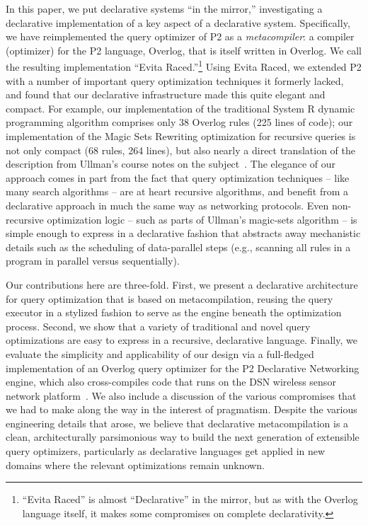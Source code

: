 \documentclass{sigmod08}
\begin{document}
In this paper, we put declarative systems ``in the mirror,''
investigating a declarative implementation of a key aspect of a
declarative system.  Specifically, we have reimplemented the query
optimizer of P2 as a {\em metacompiler}: a compiler (optimizer) for the
P2 language, Overlog, that is itself written in Overlog.  We call the
resulting implementation ``Evita Raced.''\footnote{``Evita Raced'' is
almost ``Declarative'' in the mirror, but as with the Overlog language
itself, it makes some compromises on complete declarativity.}  Using
Evita Raced, we extended P2 with a number of important query
optimization techniques it formerly lacked, and found that our
declarative infrastructure made this quite elegant and compact. For
example, our implementation of the traditional System R dynamic
programming algorithm comprises only 38 Overlog rules (225 lines of
code); our implementation of the Magic Sets Rewriting optimization for
recursive queries is not only compact (68 rules, 264 lines), but also
nearly a direct translation of the description from Ullman's course
notes on the subject~\cite{ullmanNotes}.   The elegance of our
approach comes in part from the fact that query optimization techniques
-- like many search algorithms -- are at heart recursive algorithms, and
benefit from a declarative approach in much the same way as networking
protocols.  Even non-recursive optimization logic -- such as parts of
Ullman's magic-sets algorithm -- is simple enough to express in a
declarative fashion that abstracts away mechanistic details such as the
scheduling of data-parallel steps (e.g., scanning all rules in a program
in parallel versus sequentially).

Our contributions here are three-fold.  First, we present a declarative
architecture for query optimization that is based on metacompilation,
reusing the query executor in a stylized fashion to serve as the engine beneath the optimization process.  Second, we show that a variety of traditional and novel query optimizations are easy to express in a recursive, declarative language. Finally, we evaluate the simplicity and applicability of our design via a full-fledged implementation of an Overlog query optimizer for the P2 Declarative Networking engine, which also cross-compiles code that runs on the DSN wireless sensor network platform~\cite{chu-sensys07}.  
We also include a discussion of the various compromises that we had to make along the way in the interest of pragmatism.  Despite the various engineering details that arose, we believe that declarative metacompilation is a clean, architecturally parsimonious way to build the next generation of extensible query optimizers, particularly as declarative languages get applied in new domains where the relevant optimizations remain unknown.
\end{document}

